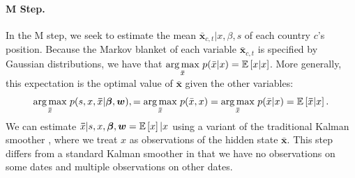

\paragraph{M Step.} In the M step, we seek to estimate the mean $\bm
\bar x_{c,t} | x, \beta, s$ of each country $c$'s position.  Because
the Markov blanket of each variable $\bm \bar x_{c,t}$ is specified by
Gaussian distributions, we have that $\underset{\bm \bar x} { \arg
  \max }\hspace{3pt} p( \bar x | x ) = \mathbb{E}\left[x | x\right]$.  More
generally, this expectation is the optimal value of $\bm \bar x$ given
the other variables:
\begin{align}
  \underset{\bm \bar x} { \arg \max }\hspace{3pt} p(s, x, \bm \bar x |
  \bm \beta, \bm w),
  = \underset{\bm \bar x} { \arg \max }\hspace{3pt} p( \bar x,  x )
  = \underset{\bm \bar x} { \arg \max }\hspace{3pt} p( \bar x | x )
  = \mathbb{E}\left[\bm \bar x | x\right].
\end{align}
We can estimate $\bm \bar x | s, x, \bm \beta, \bm w = \mathbb{E}\left[x\right] | x$
using a variant of the traditional Kalman smoother
\citep{kalman:1960}, where we treat $x$ as observations of the hidden
state $\bm \bar x$.  This step differs from a standard Kalman smoother
in that we have no observations on some dates and multiple
observations on other dates.

